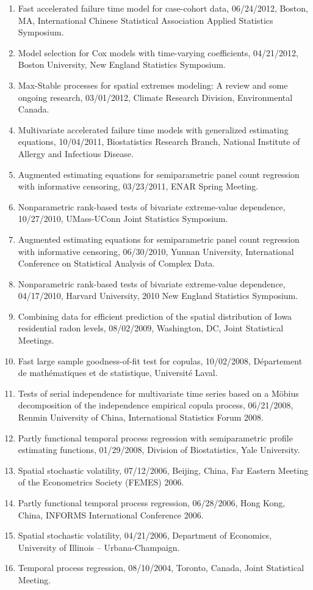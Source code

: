\documentclass[Statistics]{vita}
\begin{document}
\begin{vita}
\begin{enumerate}
  \item Fast accelerated failure time model for case-cohort data, 06/24/2012, Boston, MA, International Chinese Statistical Association Applied Statistics Symposium.
  \item Model selection for Cox models with time-varying coefficients, 04/21/2012, Boston University, New England Statistics Symposium.
  \item Max-Stable processes for spatial extremes modeling: A review and some ongoing research, 03/01/2012, Climate Research Division, Environmental Canada.
  \item Multivariate accelerated failure time models with generalized estimating equations, 10/04/2011, Biostatistics Research Branch, National Institute of Allergy and Infectious Disease.
  \item Augmented estimating equations for semiparametric panel count regression with informative censoring, 03/23/2011, ENAR Spring Meeting.
  \item Nonparametric rank-based tests of bivariate extreme-value dependence, 10/27/2010, UMass-UConn Joint Statistics Symposium.
  \item Augmented estimating equations for semiparametric panel count regression with informative censoring, 06/30/2010, Yunnan University, International Conference on Statistical Analysis of Complex Data.
  \item Nonparametric rank-based tests of bivariate extreme-value dependence, 04/17/2010, Harvard University, 2010 New England Statistics Symposium.
  \item Combining data for efficient prediction of the spatial distribution of Iowa residential radon levels, 08/02/2009, Washington, DC, Joint Statistical Meetings.
  \item Fast large sample goodness-of-fit test for copulas, 10/02/2008, D\'epartement de math\'ematiques et de statistique, Universit\'e Laval.
  \item Tests of serial independence for multivariate time series based on a M\"obius decomposition of the independence empirical copula process, 06/21/2008, Renmin University of China, International Statistics Forum 2008.
  \item Partly functional temporal process regression with semiparametric profile estimating functions, 01/29/2008, Division of Biostatistics, Yale University.
  \item Spatial stochastic volatility, 07/12/2006, Beijing, China, Far Eastern Meeting of the Econometrics Society (FEMES) 2006.
  \item Partly functional temporal process regression, 06/28/2006, Hong Kong, China, INFORMS International Conference 2006.
  \item Spatial stochastic volatility, 04/21/2006, Department of Economics, University of Illinois -- Urbana-Champaign.
  \item Temporal process regression, 08/10/2004, Toronto, Canada, Joint Statistical Meeting.
  \end{enumerate}

\end{vita}
\end{document}

